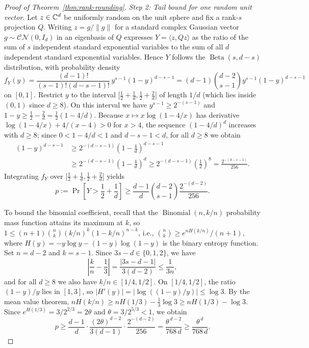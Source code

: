 \begin{proof}[Proof of Theorem~\ref{thm:rank-rounding}]
\emph{Step 2: Tail bound for one random unit vector.} Let $z\in\mathbb C^d$ be uniformly random on the unit sphere and fix a rank-$s$ projection $Q$. Writing $z=g/\|g\|$ for a standard complex Gaussian vector $g\sim\mathcal{CN}(0,I_d)$ in an eigenbasis of $Q$ expresses $Y=\langle z,Qz\rangle$ as the ratio of the sum of $s$ independent standard exponential variables to the sum of all $d$ independent standard exponential variables. Hence $Y$ follows the $\operatorname{Beta}(s,d-s)$ distribution, with probability density
\[
 f_Y(y)=\frac{(d-1)!}{(s-1)!(d-s-1)!}\,y^{s-1}(1-y)^{d-s-1}
 =(d-1)\binom{d-2}{s-1}y^{s-1}(1-y)^{d-s-1}
\]
on $[0,1]$. Restrict $y$ to the interval $\bigl[\tfrac12+\tfrac1d,\tfrac12+\tfrac2d\bigr]$ of length $1/d$ (which lies inside $(0,1)$ since $d\ge8$). On this interval we have $y^{s-1}\ge2^{-(s-1)}$ and $1-y\ge\tfrac12-\tfrac2d=\tfrac12(1-4/d)$. Because $x\mapsto x\log(1-4/x)$ has derivative $\log(1-4/x)+4/(x-4)>0$ for $x>4$, the sequence $(1-4/d)^d$ increases with $d\ge8$; since $0<1-4/d<1$ and $d-s-1<d$, for all $d\ge8$ we obtain
\begin{align*}
 (1-y)^{d-s-1}&\ge 2^{-(d-s-1)}\left(1-\frac4d\right)^{d-s-1}\\
 &\ge 2^{-(d-s-1)}\left(1-\frac4d\right)^d\ge 2^{-(d-s-1)}\left(\frac12\right)^8=\frac{2^{-(d-s-1)}}{256}.
\end{align*}
Integrating $f_Y$ over $\bigl[\tfrac12+\tfrac1d,\tfrac12+\tfrac2d\bigr]$ yields
\[
 p:=\Pr\!\left[Y>\frac12+\frac1d\right]
 \ge \frac{d-1}{d}\binom{d-2}{s-1}\frac{2^{-(d-2)}}{256}.
\]

To bound the binomial coefficient, recall that the $\operatorname{Binomial}(n,k/n)$ probability mass function attains its maximum at $k$, so $1\le(n+1)\binom{n}{k}(k/n)^k(1-k/n)^{n-k}$, i.e., $\binom{n}{k}\ge e^{nH(k/n)}/(n+1)$, where $H(y)=-y\log y-(1-y)\log(1-y)$ is the binary entropy function. Set $n=d-2$ and $k=s-1$. Since $3s-d\in\{0,1,2\}$, we have
\[
 \left|\frac{k}{n}-\frac13\right|=\frac{|3s-d-1|}{3(d-2)}\le\frac{1}{3n},
\]
and for all $d\ge8$ we also have $k/n\in[1/4,1/2]$. On $[1/4,1/2]$, the ratio $(1-y)/y$ lies in $[1,3]$, so $|H'(y)|=|\log((1-y)/y)|\le\log3$. By the mean value theorem, $nH(k/n)\ge nH(1/3)-\tfrac13\log3\ge nH(1/3)-\log3$. Since $e^{H(1/3)}=3/2^{2/3}=2\theta$ and $\theta=3/2^{5/3}<1$, we obtain
\[
 p\ge \frac{d-1}{d}\cdot\frac{(2\theta)^{d-2}}{3(d-1)}\cdot\frac{2^{-(d-2)}}{256}
 =\frac{\theta^{\,d-2}}{768\,d}
 \ge\frac{\theta^{\,d}}{768\,d}.
\]


\end{proof}

